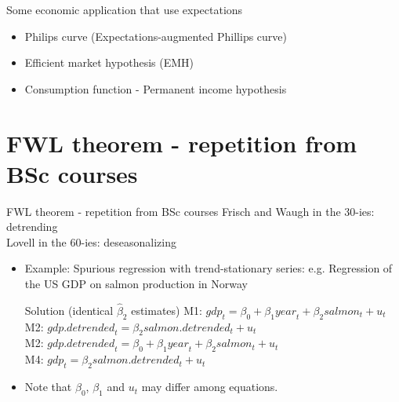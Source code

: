 \documentclass{beamer}
\begin{document}

\begin{frame}{Some economic application that use expectations}
\begin{itemize}
\item Philips curve (Expectations-augmented Phillips curve)
\item Efficient market hypothesis (EMH)
\item Consumption function - Permanent income hypothesis
\end{itemize}
\end{frame}


\section{FWL theorem - repetition from BSc courses}
\begin{frame}{FWL theorem - repetition from BSc courses}
Frisch and Waugh in the 30-ies: detrending \\
Lovell in the 60-ies: deseasonalizing
\begin{itemize}
\item Example: Spurious regression with trend-stationary series: e.g. Regression of the US GDP on salmon production in Norway
\begin{block}{Solution (identical $\hat{\beta}_2$ estimates) }
M1: $\textit{gdp}_t = \beta_0 + \beta_1 \textit{year}_t + \beta_2 \textit{salmon}_t + u_t$\\
M2: $\textit{gdp.detrended}_t = \beta_2 \textit{salmon.detrended}_t + u_t$\\
M2: $\textit{gdp.detrended}_t = \beta_0 + \beta_1 \textit{year}_t + \beta_2 \textit{salmon}_t + u_t$\\
M4: $\textit{gdp}_t = \beta_2 \textit{salmon.detrended}_t + u_t$
\end{block}
\item Note that $\beta_0$, $\beta_1$ and $u_t$ may differ among equations.
\end{itemize}
\end{frame}

\end{document}
